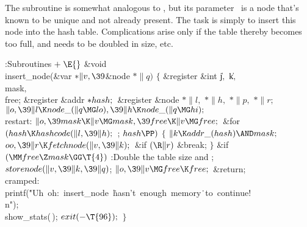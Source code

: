 The  subroutine is somewhat analogous
to , but its
parameter~ is a node that's known to
be unique and not already present. The task is simply to insert
this node into the hash table. Complications arise only if the
table thereby becomes too full, and needs to be doubled in size, etc.

\Y\B\4:Subroutines\X${}\mathrel+\E{}$\6
\&{void} \\{insert\_node}(\&{var} ${}{*}\|v,\39{}$\&{node} ${}{*}\|q){}$\1\1\2%
\2\6
${}\{{}$\1\6
\&{register} \&{int} \|j${},{}$ \|k${},{}$ \\{mask}${},{}$ \\{free};\6
\&{register} \&{addr} ${}{*}\\{hash};{}$\6
\&{register} \&{node} ${}{*}\|l,{}$ ${}{*}\|h,{}$ ${}{*}\|p,{}$ ${}{*}\|r;{}$\7
${}\|o,\39\|l\K\\{node\_}(\|q\MG\\{lo}),\39\|h\K\\{node\_}(\|q\MG\\{hi});{}$\6
\4\\{restart}:\5
${}\|o,\39\\{mask}\K\|v\MG\\{mask},\39\\{free}\K\|v\MG\\{free};{}$\6
\&{for} ${}(\\{hash}\K\\{hashcode}(\|l,\39\|h);{}$  ; ${}\\{hash}\PP){}$\5
${}\{{}$\1\6
${}\|k\K\\{addr\_}(\\{hash})\AND\\{mask};{}$\6
${}\\{oo},\39\|r\K\\{fetchnode}(\|v,\39\|k);{}$\6
\&{if} ${}(\R\|r){}$\1\5
\&{break};\2\6
\4${}\}{}$\2\6
\&{if} ${}(\MM\\{free}\Z\\{mask}\GG\T{4}){}$\1\5
:Double the table size and \X;\2\6
${}\\{storenode}(\|v,\39\|k,\39\|q){}$;\5
${}\|o,\39\|v\MG\\{free}\K\\{free};{}$\6
\&{return};\6
\4\\{cramped}:\5
\\{printf}(\.{"Uh\ oh:\ insert\_node\ }\)\.{hasn't\ enough\ memory}\)\.{\ to\
continue!\\n"});\6
\\{show\_stats}(\,);\6
${}\\{exit}({-}\T{96});{}$\6
\4${}\}{}$\2\par
\fi

